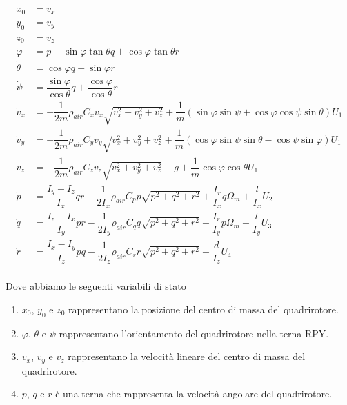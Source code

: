 \documentclass[a4paper,10pt]{article}
\begin{document}
\begin{equation}
\begin{split}
\label{modello_totale}
\dot{x}_0 &= v_x\\
\dot{y}_0 &= v_y\\
\dot{z}_0 &= v_z\\
\dot{\varphi} &= p + \sin \varphi \tan \theta q + \cos \varphi \tan \theta r \\
\dot{\theta} &= \cos\varphi q - \sin \varphi r\\
\dot{\psi} &= \dfrac{\sin \varphi}{\cos \theta} q + \dfrac{\cos \varphi}{\cos \theta} r\\
\dot{v}_x &= - \dfrac{1}{2m}\rho_{air}C_x v_x\sqrt{v_x^2+v_y^2+v_z^2} + \dfrac{1}{m}\left(\sin\varphi \sin\psi + \cos\varphi \cos\psi \sin\theta\right)U_1\\
\dot{v}_y &= - \dfrac{1}{2m}\rho_{air}C_y v_y\sqrt{v_x^2+v_y^2+v_z^2}  + \dfrac{1}{m}\left(\cos\varphi \sin\psi \sin\theta - \cos\psi \sin\varphi\right)U_1\\
\dot{v}_z &= - \dfrac{1}{2m}\rho_{air}C_z v_z\sqrt{v_x^2+v_y^2+v_z^2}  - g + \dfrac{1}{m} \cos\varphi \cos\theta U_1 \\
\dot{p} &= \dfrac{I_y -I_z}{I_x}qr - \dfrac{1}{2I_x}\rho_{air}C_pp\sqrt{p^2+q^2+r^2} + \dfrac{I_r}{I_x} q \Omega_m +  \dfrac{l}{I_x}U_2\\
\dot{q} &= \dfrac{I_z -I_x}{I_y}pr - \dfrac{1}{2I_y}\rho_{air}C_qq\sqrt{p^2+q^2+r^2}  - \dfrac{I_r}{I_y} p \Omega_m +  \dfrac{l}{I_y}U_3\\
\dot{r} &= \dfrac{I_x -I_y}{I_z}pq - \dfrac{1}{2I_z}\rho_{air}C_rr\sqrt{p^2+q^2+r^2}  + \dfrac{d}{I_z}U_4\\
\end{split}
\end{equation}

Dove abbiamo le seguenti variabili di stato

\begin{enumerate}
\item $x_0$, $y_0$ e $z_0$ rappresentano la posizione del centro di massa del quadrirotore.
\item $\varphi$, $\theta$ e $\psi$ rappresentano l'orientamento del quadrirotore nella terna RPY.
\item $v_x$, $v_y$ e $v_z$ rappresentano la velocità lineare del centro di massa del quadrirotore.
\item $p$, $q$ e $r$ è una terna che rappresenta la velocità angolare del quadrirotore.
\end{enumerate}
\end{document}

